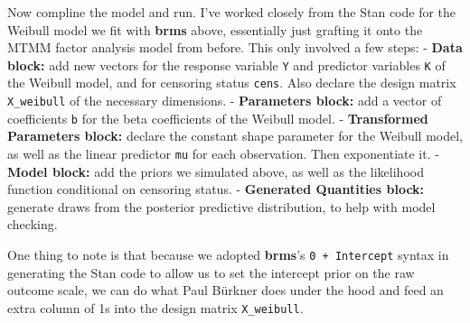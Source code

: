 \documentclass[
  letterpaper,
  DIV=11,
  numbers=noendperiod]{scrreprt}
\begin{document}
Now compline the model and run. I've worked closely from the Stan code
for the Weibull model we fit with \textbf{brms} above, essentially just
grafting it onto the MTMM factor analysis model from before. This only
involved a few steps: - \textbf{Data block:} add new vectors for the
response variable \texttt{Y} and predictor variables \texttt{K} of the
Weibull model, and for censoring status \texttt{cens}. Also declare the
design matrix \texttt{X\_weibull} of the necessary dimensions. -
\textbf{Parameters block:} add a vector of coefficients \texttt{b} for
the beta coefficients of the Weibull model. - \textbf{Transformed
Parameters block:} declare the constant shape parameter for the Weibull
model, as well as the linear predictor \texttt{mu} for each observation.
Then exponentiate it. - \textbf{Model block:} add the priors we
simulated above, as well as the likelihood function conditional on
censoring status. - \textbf{Generated Quantities block:} generate draws
from the posterior predictive distribution, to help with model checking.

One thing to note is that because we adopted \textbf{brms}'s
\texttt{0\ +\ Intercept} syntax in generating the Stan code to allow us
to set the intercept prior on the raw outcome scale, we can do what Paul
Bürkner does under the hood and feed an extra column of 1s into the
design matrix \texttt{X\_weibull}.
\end{document}
